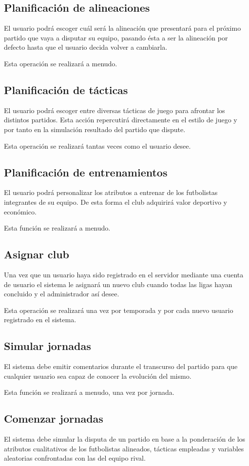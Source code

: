 \subsection{Planificación de alineaciones}
El usuario podrá escoger cuál será la alineación que presentará para el próximo
partido que vaya a disputar su equipo, pasando ésta a ser la alineación por
defecto hasta que el usuario decida volver a cambiarla.

Esta operación se realizará a menudo.
\subsection{Planificación de tácticas}
El usuario podrá escoger entre diversas tácticas de juego para afrontar los
distintos partidos. Esta acción repercutirá directamente en el estilo de juego y
por tanto en la simulación resultado del partido que dispute.

Esta operación se realizará tantas veces como el usuario desee.
\subsection{Planificación de entrenamientos}
El usuario podrá personalizar los atributos a entrenar de los futbolistas
integrantes de su equipo. De esta forma el club adquirirá valor deportivo y
económico.

Esta función se realizará a menudo.

\subsection{Asignar club}
Una vez que un usuario haya sido registrado en el servidor mediante una cuenta
de usuario el sistema le asignará un nuevo club cuando todas las ligas hayan
concluido y el administrador así desee.

Esta operación se realizará una vez por temporada y por cada nuevo usuario
registrado en el sistema.

\subsection{Simular jornadas}
El sistema debe emitir comentarios durante el transcurso del partido para que
cualquier usuario sea capaz de conocer la evolución del mismo.

Esta función se realizará a menudo, una vez por jornada.

\subsection{Comenzar jornadas}
El sistema debe simular la disputa de un partido en base a la ponderación de los
atributos cualitativos de los futbolistas alineados, tácticas empleadas y
variables aleatorias confrontadas con las del equipo rival.

